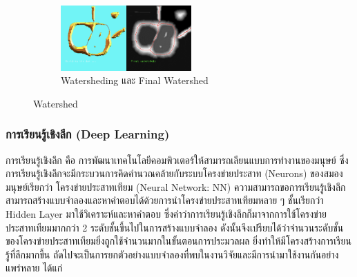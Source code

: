 \documentclass[12pt,oneside,openright,a4paper]{cpe-thai-project}
\begin{document}
\begin{itemize}
\begin{figure}[h!]
\begin{subfigure}{.5\textwidth}
  \label{fig:wawater1}
\end{subfigure}%
\begin{subfigure}{.5\textwidth}
  \centering
  \includegraphics[width=5cm]{images/wt1.png}    \caption{Watersheding และ Final Watershed}
  \label{fig:wawater2}
\end{subfigure}
\caption[Watershed]{Watershed \cite{img_watershed}}
\label{fig:watersherd}
\end{figure}
\end{itemize}

\subsubsection{การเรียนรู้เชิงลึก (Deep Learning)}
การเรียนรู้เชิงลึก คือ การพัฒนาเทคโนโลยีคอมพิวเตอร์ให้สามารถเลียนแบบการทํางานของมนุษย์ ซึ่งการเรียนรู้เชิงลึกจะมีกระบวนการคิดคํานวณคล้ายกับระบบโครงข่ายประสาท (Neurons) ของสมองมนุษย์เรียกว่า โครงข่ายประสาทเทียม (Neural Network: NN) ความสามารถขอการเรียนรู้เชิงลึกสามารถสร้างแบบจําลองและหาคําตอบได้ด้วยการนำโครงข่ายประสาทเทียมหลาย ๆ ชั้นเรียกว่า Hidden Layer มาใช้วิเคราะห์และหาคําตอบ ซึ่งคําว่าการเรียนรู้เชิงลึกก็มาจากการใช้โครงข่ายประสาทเทียมมากกว่า 2 ระดับชั้นขึ้นไปในการสร้างแบบจําลอง ดังนั้นจึงเปรียบได้ว่าจำนวนระดับชั้นของโครงข่ายประสาทเทียมยิ่งถูกใช้จํานวนมากในขั้นตอนการประมวลผล ยิ่งทําให้มีโครงสร้างการเรียนรู้ที่ลึกมากขึ้น ถัดไปจะเป็นการยกตัวอย่างแบบจำลองที่พบในงานวิจัยและมีการนำมาใช้งานกันอย่างแพร่หลาย ได้แก่
\end{document}
